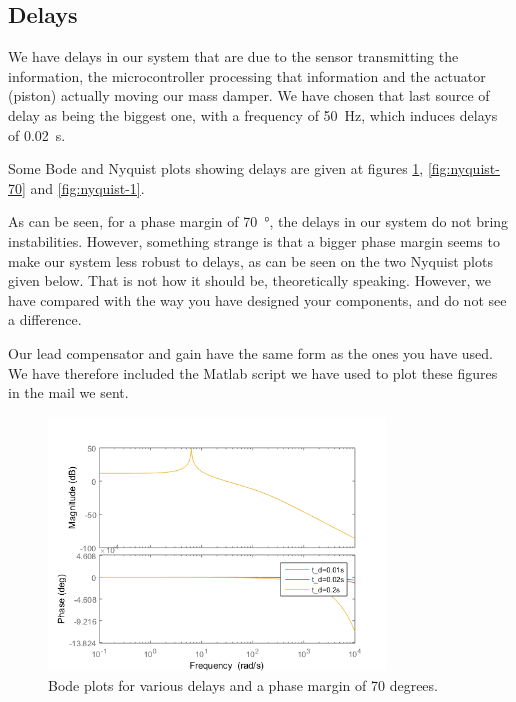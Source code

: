 \subsection{Delays}
We have delays in our system that are due to the sensor transmitting the information, the microcontroller processing that information and the actuator (piston) actually moving our mass damper. We have chosen that last source of delay as being the biggest one, with a frequency of \SI{50}{\hertz}, which induces delays of \SI{0.02}{\second}.\par
Some Bode and Nyquist plots showing delays are given at figures \ref{fig:bode-70}, \ref{fig:nyquist-70} and \ref{fig:nyquist-1}.\par
As can be seen, for a phase margin of \SI{70}{\degree}, the delays in our system do not bring instabilities. However, something strange is that a bigger phase margin seems to make our system less robust to delays, as can be seen on the two Nyquist plots given below. That is not how it should be, theoretically speaking. However, we have compared with the way you have designed your components, and do not see a difference.\par
Our lead compensator and gain have the same \og{}form\fg{} as the ones you have used. We have therefore included the Matlab script we have used to plot these figures in the mail we sent.
\begin{figure}[H]
    \centering
    \includegraphics[width=0.8\textwidth]{resources/png/bode-70.png}
    \caption{Bode plots for various delays and a phase margin of 70 degrees.}
    \label{fig:bode-70}
\end{figure}
